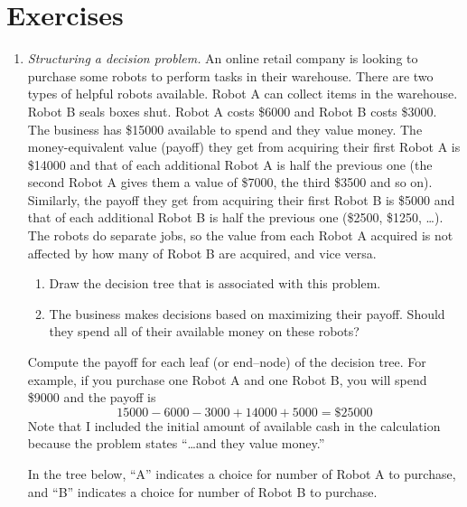 \section{Exercises}
\begin{enumerate}

\item \emph{Structuring a decision problem.}  An online retail company
  is looking to purchase some robots to perform tasks in their
  warehouse. There are two types of helpful robots available. Robot A
  can collect items in the warehouse. Robot B seals boxes shut. Robot
  A costs \$\num{6000} and Robot B costs \$\num{3000}.  The business
  has \$\num{15000} available to spend and they value money.  The
  money-equivalent value (payoff) they get from acquiring their first
  Robot A is \$\num{14000} and that of each additional Robot A is half
  the previous one (the second Robot A gives them a value of
  \$\num{7000}, the third \$\num{3500} and so on).  Similarly, the
  payoff they get from acquiring their first Robot B is \$\num{5000}
  and that of each additional Robot B is half the previous one
  (\$\num{2500}, \$\num{1250}, \ldots). The robots do separate jobs,
  so the value from each Robot A acquired is not affected by how many
  of Robot B are acquired, and vice versa.

\begin{enumerate}
\item Draw the decision tree that is associated with this problem. 
\item The business makes decisions based on maximizing their 
payoff. Should they spend all of their available money on 
these robots?
\end{enumerate}

Compute the payoff for each leaf (or end--node) of the
decision tree. For example, if you purchase one Robot A and one
Robot B, you will spend \$\num{9000} and the payoff is
  \[ \num{15000}-\num{6000}-\num{3000} + \num{14000}+\num{5000} = \$\num{25000} \]
  Note that I included the initial amount of available
  cash in the calculation because the problem states 
  ``\ldots and they value money.''

\begin{solution}
\bs
In the tree below, ``A'' indicates a choice for number of 
Robot A to purchase, and ``B'' indicates a choice for number 
of Robot B to purchase.


\end{solution}
\end{enumerate}

